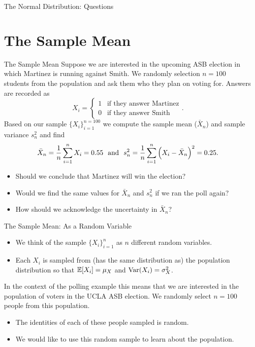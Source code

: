 \documentclass[notheorems,9pt, handout]{beamer}
\begin{document}
\begin{frame}{The Normal Distribution: Questions} 
	\label{frame:nd-questions}
	\centering
	{\Large
	}
\end{frame}
\section{The Sample Mean}
\begin{frame}{The Sample Mean} 
	\label{frame:sm-intro}
	 Suppose we are interested in the upcoming ASB election in which Martinez is running against Smith. We randomly selection \(n=100\) students from the population and ask them who they plan on voting for. Answers are recorded as 
	\[
	    X_i = \begin{cases}
	    	1 & \text{if they answer Martinez} \\
			0 & \text{if they answer Smith}
	    \end{cases}
	.\] 
	Based on our sample \(\{X_i\}_{i=1}^{n=100}\) we compute the sample mean (\(\bar X_n\)) and sample variance \(s_n^2\) and find 
	\[
	    \bar X_n = \frac{1}{n}\sum_{i=1}^n X_i = 0.55 \hbox{ }\text{ and }\hbox{ } s_n^2 = \frac{1}{n}\sum_{i=1}^n \left(X_i-\bar X_n\right)^2 = 0.25
	.\] 
	\onslide<2->
	\begin{itemize}
		\item<2-> Should we conclude that Martinez will win the election?
		\item<3-> Would we find the same values for \(\bar X_n\) and \(s_n^2\) if we ran the poll again?
		\item<4-> How should we acknowledge the uncertainty in \(\bar X_n\)?
	\end{itemize}
\end{frame}
\begin{frame}{The Sample Mean: As a Random Variable} 
	\begin{center}
	\end{center}
	\begin{itemize}
		\item We think of the sample \(\{X_i\}_{i=1}^n\) as \(n\) different random variables.
		\item Each \(X_i\) is sampled from (has the same distribution as) the population distribution so that \(\mathbb{E}[X_i]=\mu_X\) and \(\operatorname{Var}(X_i)=\sigma_X^2\).
	\end{itemize}
	In the context of the polling example this means that we are interested in the population of voters in the UCLA ASB election. We randomly select \(n=100\) people from this population.
	\begin{itemize}
		\item The identities of each of these people sampled is random.
		\item We would like to use this random sample to learn about the population.
	\end{itemize}
\end{frame}
\end{document}
